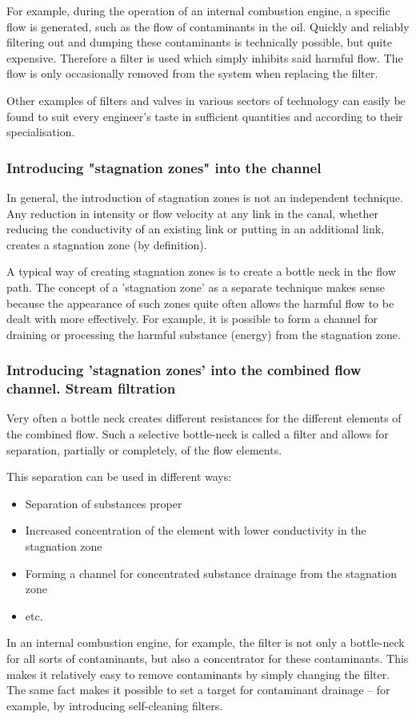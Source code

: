 \documentclass[a4paper,11pt]{article}
\begin{document}
For example, during the operation of an internal combustion engine, a specific
flow is generated, such as the flow of contaminants in the oil. Quickly and
reliably filtering out and dumping these contaminants is technically possible,
but quite expensive. Therefore a filter is used which simply inhibits said
harmful flow. The flow is only occasionally removed from the system when
replacing the filter.

Other examples of filters and valves in various sectors of technology can
easily be found to suit every engineer's taste in sufficient quantities and
according to their specialisation.

\subsubsection{Introducing "stagnation zones" into the channel}

In general, the introduction of stagnation zones is not an independent
technique. Any reduction in intensity or flow velocity at any link in the
canal, whether reducing the conductivity of an existing link or putting in an
additional link, creates a stagnation zone (by definition).

A typical way of creating stagnation zones is to create a bottle neck in the
flow path. The concept of a 'stagnation zone' as a separate technique makes
sense because the appearance of such zones quite often allows the harmful flow
to be dealt with more effectively. For example, it is possible to form a
channel for draining or processing the harmful substance (energy) from the
stagnation zone.

\subsubsection{Introducing 'stagnation zones' into the combined flow channel.
  Stream filtration}

Very often a bottle neck creates different resistances for the different
elements of the combined flow. Such a selective bottle-neck is called a filter
and allows for separation, partially or completely, of the flow elements.

This separation can be used in different ways:
\begin{itemize}
\item Separation of substances proper
\item Increased concentration of the element with lower conductivity in the
  stagnation zone
\item Forming a channel for concentrated substance drainage from the
  stagnation zone
\item etc.
\end{itemize}
In an internal combustion engine, for example, the filter is not only a
bottle-neck for all sorts of contaminants, but also a concentrator for these
contaminants. This makes it relatively easy to remove contaminants by simply
changing the filter. The same fact makes it possible to set a target for
contaminant drainage -- for example, by introducing self-cleaning filters.
\end{document}

